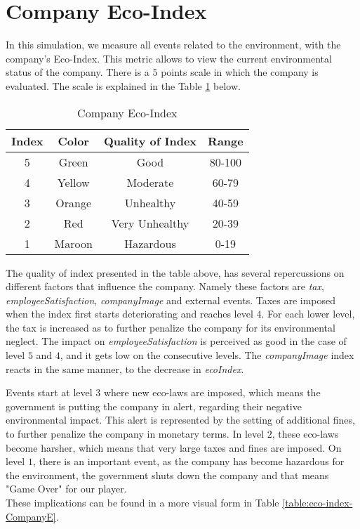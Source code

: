 \section{Company Eco-Index}
\label{sec:compEco-idex}
In this simulation, we measure all events related to the environment, with the company's Eco-Index. This metric allows to view the current environmental status of the company. There is a $5$ points scale in which the company is evaluated. The scale is explained in the Table \ref{table:eco-index-Company} below. \\

\begin{table}[ht]
\centering
\begin{tabular}{|c|c|c|c|}
\hline
 Index & Color & Quality of Index & Range \\
\hline
 5 & \cellcolor[HTML]{228b22}Green & Good & 80-100\\ \hline
 4 & \cellcolor[HTML]{ffff00}Yellow & Moderate & 60-79\\  \hline
 3 & \cellcolor[HTML]{ffd700}Orange & Unhealthy & 40-59\\ \hline
 2 & \cellcolor[HTML]{ff0000}Red & Very Unhealthy & 20-39 \\ \hline
 1 & \cellcolor[HTML]{a52a2a}Maroon & Hazardous & 0-19\\
\hline
\end{tabular}
\caption{Company Eco-Index}
\label{table:eco-index-Company}
\end{table}

The quality of index presented in the table above, has several repercussions on different factors that influence the company. Namely these factors are \textit{tax}, \textit{employeeSatisfaction}, \textit{companyImage} and external events. Taxes are imposed when the index first starts deteriorating and reaches level $4$. For each lower level, the tax is increased as to further penalize the company for its environmental neglect. The impact on \textit{employeeSatisfaction} is perceived as good in the case of level $5$ and $4$, and it gets low on the consecutive levels. The \textit{companyImage} index reacts in the same manner, to the decrease in \textit{ecoIndex}.

Events start at level $3$ where new eco-laws are imposed, which means the government is putting the company in alert, regarding their negative environmental impact. This alert is represented by the setting of additional fines, to further penalize the company in monetary terms. In level $2$, these eco-laws become harsher, which means that very large taxes and fines are imposed. On level $1$, there is an important event, as the company has become hazardous for the environment, the government shuts down the company and that means "Game Over" for our player. \\
 These implications can be found in a more visual form in Table \ref{table:eco-index-CompanyE}.

